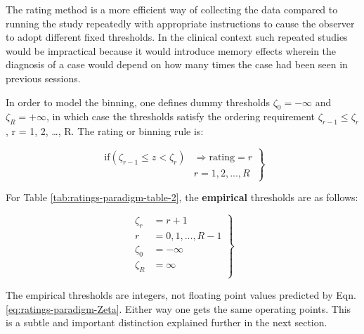 \documentclass[
]{book}
\begin{document}
The rating method is a more efficient way of collecting the data compared to running the study repeatedly with appropriate instructions to cause the observer to adopt different fixed thresholds. In the clinical context such repeated studies would be impractical because it would introduce memory effects wherein the diagnosis of a case would depend on how many times the case had been seen in previous sessions.

In order to model the binning, one defines dummy thresholds \(\zeta_0 = - \infty\) and \(\zeta_R = + \infty\), in which case the thresholds satisfy the ordering requirement \(\zeta_{r-1} \le \zeta_r\) , r = 1, 2, \ldots, R. The rating or binning rule is:

\begin{equation}
\left.
\begin{aligned}  
\text{if} \left (\zeta_{r-1} \le z < \zeta_r  \right )&\Rightarrow \text{rating} = r\\
&r = 1, 2, ..., R
\end{aligned}
\right \}
\label{eq:ratings-paradigm-binning-rule}
\end{equation}

For Table \ref{tab:ratings-paradigm-table-2}, the \textbf{empirical} thresholds are as follows:

\begin{equation} 
\left.
\begin{aligned}
\zeta_r &= r + 1 \\
r &= 0, 1, ..., R-1\\
\zeta_0 &= -\infty\\
\zeta_R &= \infty\\
\end{aligned}
\right \}
\label{eq:ratings-paradigm-empirical-zeta}
\end{equation}

The empirical thresholds are integers, not floating point values predicted by Eqn. \eqref{eq:ratings-paradigm-Zeta}. Either way one gets the same operating points. This is a subtle and important distinction explained further in the next section.
\end{document}
